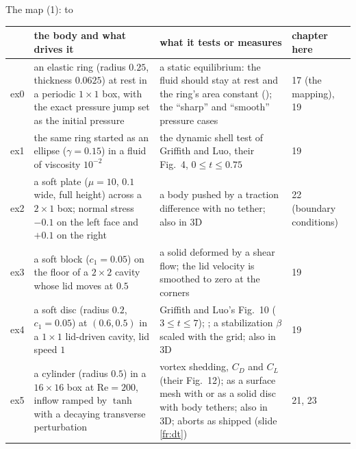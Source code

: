\documentclass[aspectratio=169,11pt]{beamer}
\begin{document}
\begin{frame}{The map (1):  to }
\label{fr:map}
\scriptsize
\setlength{\tabcolsep}{3pt}
\begin{tabular}{@{}L{0.05\textwidth}L{0.3\textwidth}L{0.3\textwidth}L{0.3\textwidth}@{}}
\toprule
& the body and what drives it & what it tests or measures & chapter here \\
\midrule
ex0 & an elastic ring (radius $0.25$, thickness $0.0625$) at rest in a periodic $1\times1$ box, with the exact pressure jump set as the initial pressure & a static equilibrium: the fluid should stay at rest and the ring's area constant (); the ``sharp'' and ``smooth'' pressure cases & 17 (the mapping), 19 \\
ex1 & the same ring started as an ellipse ($\gamma = 0.15$) in a fluid of viscosity $10^{-2}$ & the dynamic shell test of Griffith and Luo, their Fig.\ 4, $0 \le t \le 0.75$ & 19 \\
ex2 & a soft plate ($\mu = 10$, $0.1$ wide, full height) across a $2\times1$ box; normal stress $-0.1$ on the left face and $+0.1$ on the right & a body pushed by a traction difference with no tether; also in 3D & 22 (boundary conditions) \\
ex3 & a soft block ($c_1 = 0.05$) on the floor of a $2\times2$ cavity whose lid moves at $0.5$ & a solid deformed by a shear flow; the lid velocity is smoothed to zero at the corners & 19 \\
ex4 & a soft disc (radius $0.2$, $c_1 = 0.05$) at $(0.6, 0.5)$ in a $1\times1$ lid-driven cavity, lid speed $1$ & Griffith and Luo's Fig.\ 10 ($3 \le t \le 7$); ; a stabilization $\beta$ scaled with the grid; also in 3D & 19 \\
ex5 & a cylinder (radius $0.5$) in a $16\times16$ box at $\mathrm{Re} = 200$, inflow ramped by $\tanh$ with a decaying transverse perturbation & vortex shedding, $C_D$ and $C_L$ (their Fig.\ 12); as a surface mesh with  or as a solid disc with body tethers; also in 3D; aborts as shipped (slide \ref{fr:dt}) & 21, 23 \\
\bottomrule
\end{tabular}
\end{frame}
\end{document}
